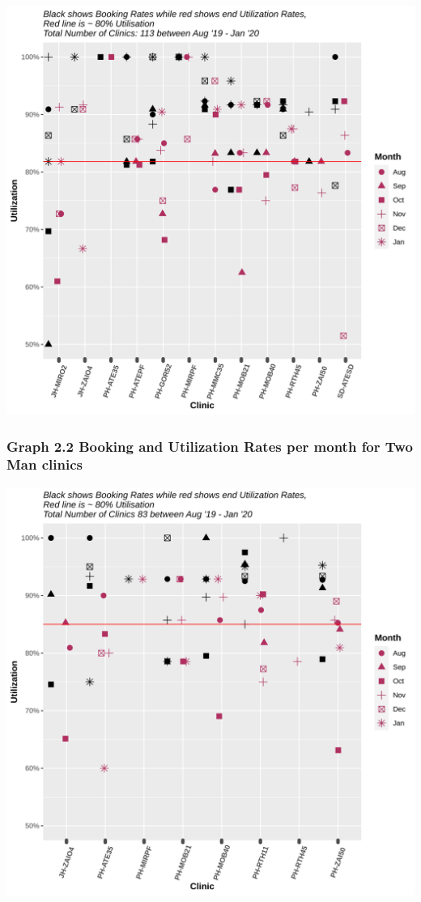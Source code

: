 \documentclass[]{article}
\begin{document}
\begin{center}\includegraphics{LF2_files/figure-latex/unnamed-chunk-6-1} \end{center}

\hypertarget{graph-2.2-booking-and-utilization-rates-per-month-for-two-man-clinics}{%
\subsubsection{Graph 2.2 Booking and Utilization Rates per month for Two
Man
clinics}\label{graph-2.2-booking-and-utilization-rates-per-month-for-two-man-clinics}}

\begin{center}\includegraphics{LF2_files/figure-latex/unnamed-chunk-7-1} \end{center}
\end{document}
